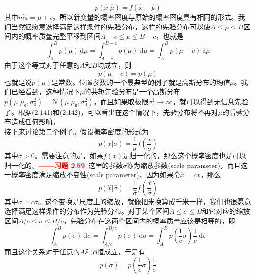 \documentclass[b5paper]{book}
\numberwithin{equation}{chapter}
\newcommand {\calN} {\mathcal{N}}
\begin{document}
{	\begin{equation}
		p(\hat{x}|\hat{\mu})=f(\hat{x}-\hat{\mu})
	\end{equation}
	其中$\hat{mu}=\mu+c$。所以新变量的概率密度与原始的概率密度具有相同的形式。我们当然很愿意选择满足这样条件的先验分布，这样的先验分布可以使$A \leqslant \mu \leqslant B$区间内的概率质量完整平移到区间$A-c \leqslant \mu \leqslant B-c$，也就是
	\begin{equation}
		\int_A^B p(\mu)\ \mathrm{d}\mu = \int _{A-c}^{B-c}p(\mu)\ \mathrm{d}\mu = \int_A^B p(\mu-c)\ \mathrm{d}\mu
	\end{equation}
	由于这个等式对于任意的$A$和$B$均成立，则
	\begin{equation}
		p(\mu-c)=p(\mu)
	\end{equation}
	也就是说$p(\mu)$是常数。位置参数的一个最典型的例子就是高斯分布的均值$\mu$。我们已经看到，这种情况下$\mu$的共轭先验分布是一个高斯分布$p(\mu|\mu_0,\sigma_0^2)=\calN(\mu|\mu_0,\sigma_0^2)$，而且如果取极限$\sigma_0^2 \rightarrow \infty$，就可以得到无信息先验了。根据(2.141)和(2.142)，可以看出在这个情况下，先验分布将不再对$\mu$的后验分布造成任何影响。\\
	\indent 接下来讨论第二个例子。假设概率密度的形式为
	\begin{equation}
		p(x|\sigma)=\frac{1}{\sigma}f\left(\frac{x}{\sigma}\right)
	\end{equation}
	其中$\sigma>0$。需要注意的是，如果$f(x)$是归一化的，那么这个概率密度也是可以归一化的。\textcolor{red}{\textbf{——习题 2.59}}\ 这里的参数$\sigma$称为缩放参数(scale parameter)，而且这一概率密度满足缩放不变性(scale parameter)，因为如果令$\hat{x}=cx$，那么
	\begin{equation}
		p(\hat{x}|\hat{\sigma})=\frac{1}{\hat{\sigma}}f\left(\frac{\hat{x}}{\hat{\sigma}}\right)
	\end{equation}
	其中$\hat{\sigma}=c\sigma$。这个变换是尺度上的缩放，就像把米换算成千米一样，我们也很愿意选择满足这样条件的分布作为先验分布。对于某个区间$A \leqslant \sigma \leqslant B$和它对应的缩放区间$A/c \leqslant \sigma \leqslant B/c$，先验分布在这两个区间内的概率质量应该是相等的，即
	\begin{equation}
		\int_A^B p(\sigma)\ \mathrm{d}\sigma =\int_{A/c}^{B/c} p(\sigma)\ \mathrm{d}\sigma = \int_A^B p\left(\frac{1}{c}\sigma\right)\frac{1}{c}\ \mathrm{d}\sigma
	\end{equation}
	而且这个关系对于任意的$A$和$B$恒成立，于是有
	\begin{equation}
		p(\sigma)=p\left(\frac{1}{c}\sigma\right)\frac{1}{c}
	\end{equation}
}
\end{document}

